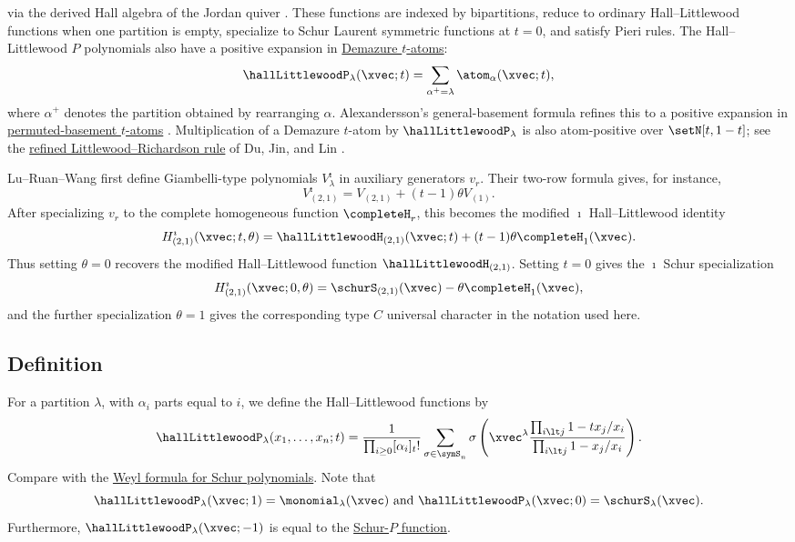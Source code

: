 \label{doubleHallLittlewoodPolynomial}
via the derived Hall algebra of the
Jordan quiver \cite{ChenLuRuan2026x}.  These functions are indexed by
bipartitions, reduce to ordinary Hall--Littlewood functions when one partition
is empty, specialize to Schur Laurent symmetric functions at $t=0$, and satisfy
Pieri rules.
The Hall--Littlewood $P$ polynomials also have a positive expansion in
\hyperref[tAtom]{Demazure $t$-atoms}:
\[
\hallLittlewoodP_\lambda(\xvec;t)
  = \sum_{\alpha^+=\lambda} \atom_\alpha(\xvec;t),
\]
where $\alpha^+$ denotes the partition obtained by rearranging $\alpha$.
Alexandersson's general-basement formula refines this to a positive expansion
in \hyperref[permutedBasementTAtom]{permuted-basement $t$-atoms}
\cite{Alexandersson2015gbMacdonald}.
Multiplication of a Demazure $t$-atom by $\hallLittlewoodP_\lambda$
is also atom-positive over $\setN[t,1-t]$; see the
\hyperref[tAtomHallLittlewoodProduct]{refined Littlewood--Richardson rule}
of Du, Jin, and Lin \cite{DuJinLin2026x}.

\begin{example*}
Lu--Ruan--Wang first define Giambelli-type polynomials
$V^{\imath}_\lambda$ in auxiliary generators $v_r$.  Their two-row formula
\cite[Lem.~2.2]{LuRuanWang2025} gives, for instance,
\[
  V^{\imath}_{(2,1)}
  = V_{(2,1)} + (t-1)\theta V_{(1)}.
\]
After specializing $v_r$ to the complete homogeneous function
$\completeH_r$, this becomes the modified $\imath$ Hall--Littlewood identity
\[
  H^{\imath}_{(2,1)}(\xvec;t,\theta)
  = \hallLittlewoodH_{(2,1)}(\xvec;t)
    +(t-1)\theta\completeH_1(\xvec).
\]
Thus setting $\theta=0$ recovers the modified Hall--Littlewood function
$\hallLittlewoodH_{(2,1)}$.  Setting $t=0$ gives the $\imath$ Schur
specialization
\[
  H^{\imath}_{(2,1)}(\xvec;0,\theta)
  =\schurS_{(2,1)}(\xvec)-\theta\completeH_1(\xvec),
\]
and the further specialization $\theta=1$ gives the corresponding type $C$
universal character in the notation used here.
\end{example*}

\subsection[hallLittleWoodPWeylformula]{Definition}

For a partition $\lambda$, with $\alpha_i$ parts equal to $i$, we define the
Hall--Littlewood functions by
\begin{equation*}
\hallLittlewoodP_\lambda(x_1,\dotsc,x_n;t)
=
\frac{1}{\prod_{i\geq 0} [\alpha_i]_t! }\sum_{\sigma \in \symS_n}
\sigma\left(
  \xvec^\lambda
  \frac{\prod_{i \lt j} 1-tx_j/x_i}{\prod_{i \lt j} 1-x_j/x_i}
\right).
\end{equation*}
Compare with the \hyperref[schurWeylformula]{Weyl formula for Schur polynomials}.
Note that
\[
\hallLittlewoodP_\lambda(\xvec;1) = \monomial_\lambda(\xvec) \text{ and }
\hallLittlewoodP_\lambda(\xvec;0) = \schurS_\lambda(\xvec).
\]
Furthermore, $\hallLittlewoodP_\lambda(\xvec;-1)$ is equal to the
\hyperref[schurP]{Schur-$P$ function}.

